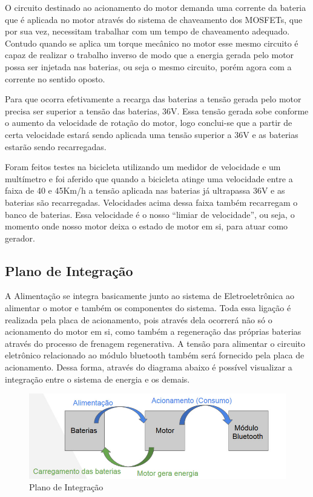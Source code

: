 O circuito destinado ao acionamento do motor demanda uma corrente da bateria que é aplicada no motor através do sistema de chaveamento dos MOSFETs, que por sua vez, necessitam trabalhar com um tempo de chaveamento adequado. Contudo quando se aplica um torque mecânico no motor esse mesmo circuito é capaz de realizar o trabalho inverso de modo que a energia gerada pelo motor possa ser injetada nas baterias, ou seja o mesmo circuito, porém agora com a corrente no sentido oposto.

Para que ocorra efetivamente a recarga das baterias a tensão gerada pelo motor precisa ser superior a tensão das baterias, 36V. Essa tensão gerada sobe conforme o aumento da velocidade de rotação do motor, logo conclui-se que a partir de certa velocidade estará sendo aplicada uma tensão superior a 36V e as baterias estarão sendo recarregadas.

Foram feitos testes na bicicleta utilizando um medidor de velocidade e um multímetro e foi aferido que quando a bicicleta atinge uma velocidade entre a faixa de 40 e 45Km/h a tensão aplicada nas baterias já ultrapassa 36V e as baterias são recarregadas. Velocidades acima dessa faixa também recarregam o banco de baterias. Essa velocidade é o nosso “limiar de velocidade”, ou seja, o momento onde nosso motor deixa o estado de motor em si, para atuar como gerador.

\subsection{Plano de Integração}
A Alimentação se integra basicamente junto ao sistema de Eletroeletrônica ao alimentar o motor e também os componentes do sistema. Toda essa ligação é realizada pela placa de acionamento, pois através dela ocorrerá não só o acionamento do motor em si, como também a regeneração das próprias baterias através do processo de frenagem regenerativa. A tensão para alimentar o circuito eletrônico relacionado ao módulo bluetooth também será fornecido pela placa de acionamento. Dessa forma, através do diagrama abaixo é possível visualizar a integração entre o sistema de energia e os demais. 

\graphicspath{{figuras/}}
\begin{figure}[h!]
\centering
\includegraphics[scale=0.50]{integracao_alimentacao}
\caption{Plano de Integração}
\label{plano_integracao}
\end{figure}

